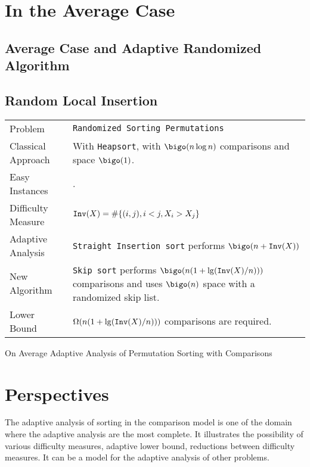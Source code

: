 \section{In the Average Case}
\label{sec:other-types-adaptive}

\subsection{Average Case and Adaptive Randomized Algorithm}
\label{sec:aver-case-adapt}

\subsection{Random Local Insertion}
\label{sec:rand-local-insert}



\begin{adaptiveanalysis}[e]
  \begin{tabular}{@{\bf}p{}p{}}
    Problem            & {\tt Randomized Sorting Permutations}\\               
    Classical Approach & With {\tt Heapsort}, with $\bigo(n\log n)$ comparisons and space $\bigo(1)$. \\
    Easy Instances     & .\\
    Difficulty Measure & $\mathtt{Inv}(X)=\#\{(i,j), i<j, X_i > X_j\}$\\
    Adaptive Analysis  & {\tt Straight Insertion sort} performs $\bigo( n + \idtt{Inv}(X) ) $ \\
    New Algorithm      & {\tt Skip sort} performs $\bigo( n ( 1 + \lg( \idtt{Inv}(X) / n ) ) )$ comparisons 
    and uses $\bigo(n)$ space with a randomized skip list. \\
    Lower Bound        & $\Omega( n ( 1 + \lg( \mathtt{Inv}(X) / n ) ) )$ comparisons are required. \\
  \end{tabular}
  \caption{On Average Adaptive Analysis of Permutation Sorting with
    Comparisons}
  \label{tab:permutationSortingRandomized}
\end{adaptiveanalysis}


\section{Perspectives}
\label{sec:perspectives}

The adaptive analysis of sorting in the comparison model is one of the
domain where the adaptive analysis are the most complete. It
illustrates the possibility of various difficulty measures, adaptive
lower bound, reductions between difficulty measures. It can be a model
for the adaptive analysis of other problems.

